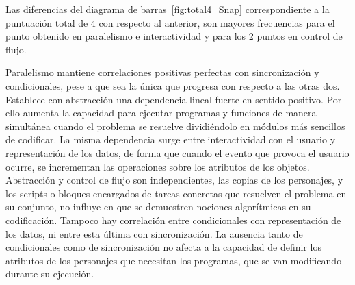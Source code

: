 \documentclass[a4paper, 12pt]{book}
\begin{document}
Las diferencias del diagrama de barras~\ref{fig:total4_Snap} correspondiente a la puntuación total de 4 con respecto al anterior, son mayores frecuencias para el punto obtenido en paralelismo e interactividad y para los 2 puntos en control de flujo.

Paralelismo mantiene correlaciones positivas perfectas con sincronización y condicionales, pese a que sea la única que progresa con respecto a las otras dos. Establece con abstracción una dependencia lineal fuerte en sentido positivo. Por ello aumenta la capacidad para ejecutar programas y funciones de manera simultánea cuando el problema se resuelve dividiéndolo en módulos más sencillos de codificar. 
La misma dependencia surge entre interactividad con el usuario y representación de los datos, de forma que cuando el evento que provoca el usuario ocurre, se incrementan las operaciones sobre los atributos de los objetos. 
Abstracción y control de flujo son independientes, las copias de los personajes, y los scripts o bloques encargados de tareas concretas que resuelven el problema en su conjunto, no influye en que se demuestren nociones algorítmicas en su codificación.
Tampoco hay correlación entre condicionales con representación de los datos, ni entre esta última con sincronización. La ausencia tanto de condicionales como de sincronización no afecta a la capacidad de definir los atributos de los personajes que necesitan los programas, que se van modificando durante su ejecución.
\end{document}
